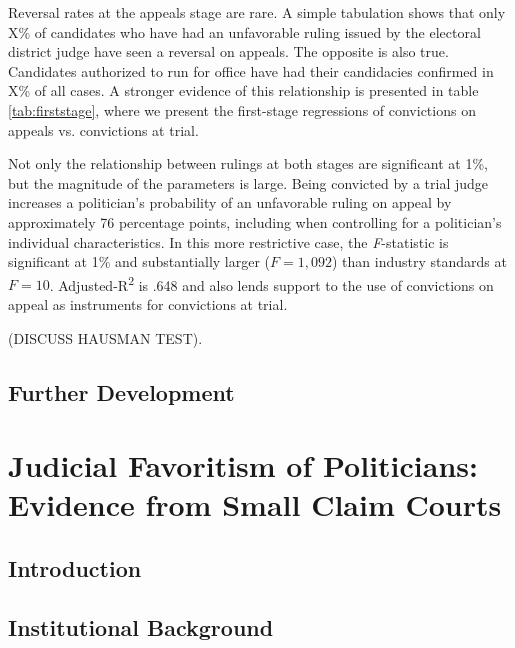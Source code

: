 \documentclass[11pt]{article}
\begin{document}
Reversal rates at the appeals stage are rare. A simple tabulation shows that only X\% of candidates who have had an unfavorable ruling issued by the electoral district judge have seen a reversal on appeals. The opposite is also true. Candidates authorized to run for office have had their candidacies confirmed in X\% of all cases. A stronger evidence of this relationship is presented in table \ref{tab:firststage}, where we present the first-stage regressions of convictions on appeals vs. convictions at trial.



Not only the relationship between rulings at both stages are significant at 1\%, but the magnitude of the parameters is large. Being convicted by a trial judge increases a politician's probability of an unfavorable ruling on appeal by approximately 76 percentage points, including when controlling for a politician's individual characteristics. In this more restrictive case, the \emph{F}-statistic is significant at 1\% and substantially larger ($F = 1{,}092$) than industry standards at $F = 10$. Adjusted-R\textsuperscript{2} is .648 and also lends support to the use of convictions on appeal as instruments for convictions at trial.

(DISCUSS HAUSMAN TEST).







\subsection{Further Development} \label{subsec:conclusion_paper1}

\clearpage

\section{Judicial Favoritism of Politicians: Evidence from Small Claim Courts} \label{sec:paper2}

\subsection{Introduction} \label{subsec:introduction_paper2}

\subsection{Institutional Background} \label{subsec:background_paper2}
\end{document}
